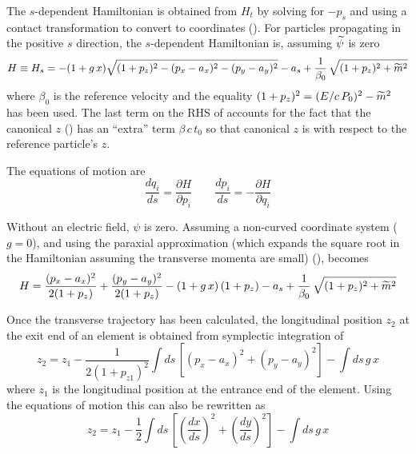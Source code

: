 The $s$-dependent Hamiltonian is obtained from $H_t$ by solving for
$-p_s$ and using a contact transformation to convert to \bmad
coordinates (). For particles propagating in the
positive $s$ direction, the $s$-dependent Hamiltonian is, assuming
$\widetilde\psi$ is zero
\begin{equation}
  H \equiv H_s = -(1 + g \, x) \sqrt{(1 + p_z)^2 - (p_x - a_x)^2 - (p_y - a_y)^2} - 
  a_s + \frac{1}{\beta_0} \, \sqrt{(1+p_z)^2 + \widetilde m^2}
  \label{h1gx1}
\end{equation}
where $\beta_0$ is the reference velocity and the equality $(1 +
p_z)^2 = (E/c\, P_0)^2 - \widetilde m^2$ has been used. The last term on the
RHS of  accounts for the fact that the \bmad canonical $z$
() has an ``extra'' term $\beta \, c \, t_0$ so that \bmad
canonical $z$ is with respect to the reference particle's $z$.

The equations of motion are
\begin{equation}
  \frac{dq_i}{ds} = \frac{\partial H}{\partial p_i} \qquad
  \frac{dp_i}{ds} = -\frac{\partial H}{\partial q_i}
  \label{rshp}
\end{equation}

\label{paraxial approximation} Without an electric field, $\psi$ is zero. Assuming a
non-curved coordinate system ($g = 0$), and using the paraxial approximation (which
expands the square root in the Hamiltonian assuming the transverse momenta are small)
(),  becomes
\begin{equation}
  H = \frac{(p_x - a_x)^2}{2 (1 + p_z)} + \frac{(p_y - a_y)^2}{2 (1 + p_z)} - 
  (1 + g \, x) \, (1 + p_z) - a_s +   \frac{1}{\beta_0} \, \sqrt{(1+p_z)^2 + \widetilde m^2}
  \label{hpapa}
\end{equation}

Once the transverse trajectory has been calculated, the longitudinal position
$z_2$ at the exit end of an element is obtained from symplectic
integration of 
\begin{equation}
  z_2 = z_1 - \frac{1}{2 (1 + p_{z1})^2} \int \! ds \, 
  \left[ (p_x - a_x)^2 + (p_y - a_y)^2 \right] - \int \! ds \, g \, x
  \label{zz121p}
\end{equation}
where $z_1$ is the longitudinal position at the entrance end of the element.
Using the equations of motion  this can also be rewritten as
\begin{equation}
  z_2 = z_1 - \frac{1}{2} \int \! ds \, 
  \left[ \left( \frac{dx}{ds} \right)^2 + \left( \frac{dy}{ds} \right)^2 \right] - 
  \int \! ds \, g \, x
  \label{zz12sx}
\end{equation}

